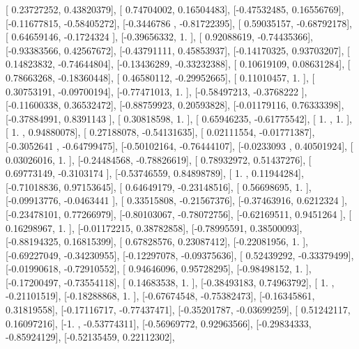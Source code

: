\documentclass{article}
\begin{document}
       [ 0.23727252,  0.43820379],
       [ 0.74704002,  0.16504483],
       [-0.47532485,  0.16556769],
       [-0.11677815, -0.58405272],
       [-0.3446786 , -0.81722395],
       [ 0.59035157, -0.68792178],
       [ 0.64659146, -0.1724324 ],
       [-0.39656332,  1.        ],
       [ 0.92088619, -0.74435366],
       [-0.93383566,  0.42567672],
       [-0.43791111,  0.45853937],
       [-0.14170325,  0.93703207],
       [ 0.14823832, -0.74644804],
       [-0.13436289, -0.33232388],
       [ 0.10619109,  0.08631284],
       [ 0.78663268, -0.18360448],
       [ 0.46580112, -0.29952665],
       [ 0.11010457,  1.        ],
       [ 0.30753191, -0.09700194],
       [-0.77471013,  1.        ],
       [-0.58497213, -0.3768222 ],
       [-0.11600338,  0.36532472],
       [-0.88759923,  0.20593828],
       [-0.01179116,  0.76333398],
       [-0.37884991,  0.8391143 ],
       [ 0.30818598,  1.        ],
       [ 0.65946235, -0.61775542],
       [ 1.        ,  1.        ],
       [ 1.        ,  0.94880078],
       [ 0.27188078, -0.54131635],
       [ 0.02111554, -0.01771387],
       [-0.3052641 , -0.64799475],
       [-0.50102164, -0.76444107],
       [-0.0233093 ,  0.40501924],
       [ 0.03026016,  1.        ],
       [-0.24484568, -0.78826619],
       [ 0.78932972,  0.51437276],
       [ 0.69773149, -0.3103174 ],
       [-0.53746559,  0.84898789],
       [ 1.        ,  0.11944284],
       [-0.71018836,  0.97153645],
       [ 0.64649179, -0.23148516],
       [ 0.56698695,  1.        ],
       [-0.09913776, -0.0463441 ],
       [ 0.33515808, -0.21567376],
       [-0.37463916,  0.6212324 ],
       [-0.23478101,  0.77266979],
       [-0.80103067, -0.78072756],
       [-0.62169511,  0.9451264 ],
       [ 0.16298967,  1.        ],
       [-0.01172215,  0.38782858],
       [-0.78995591,  0.38500093],
       [-0.88194325,  0.16815399],
       [ 0.67828576,  0.23087412],
       [-0.22081956,  1.        ],
       [-0.69227049, -0.34230955],
       [-0.12297078, -0.09375636],
       [ 0.52439292, -0.33379499],
       [-0.01990618, -0.72910552],
       [ 0.94646096,  0.95728295],
       [-0.98498152,  1.        ],
       [-0.17200497, -0.73554118],
       [ 0.14683538,  1.        ],
       [-0.38493183,  0.74963792],
       [ 1.        , -0.21101519],
       [-0.18288868,  1.        ],
       [-0.67674548, -0.75382473],
       [-0.16345861,  0.31819558],
       [-0.17116717, -0.77437471],
       [-0.35201787, -0.03699259],
       [ 0.51242117,  0.16097216],
       [-1.        , -0.53774311],
       [-0.56969772,  0.92963566],
       [-0.29834333, -0.85924129],
       [-0.52135459,  0.22112302],
\end{document}
